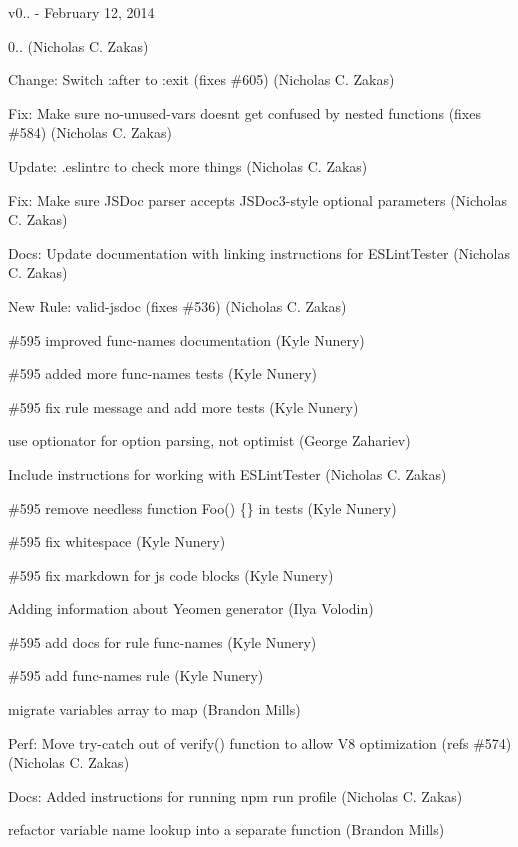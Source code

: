 v0.. -\/ February 12, 2014


\begin{DoxyItemize}
\item 0.. (Nicholas C. Zakas)
\item Change\+: Switch \+:after to \+:exit (fixes \#605) (Nicholas C. Zakas)
\item Fix\+: Make sure no-\/unused-\/vars doesn\textquotesingle{}t get confused by nested functions (fixes \#584) (Nicholas C. Zakas)
\item Update\+: .eslintrc to check more things (Nicholas C. Zakas)
\item Fix\+: Make sure J\+S\+Doc parser accepts J\+S\+Doc3-\/style optional parameters (Nicholas C. Zakas)
\item Docs\+: Update documentation with linking instructions for E\+S\+Lint\+Tester (Nicholas C. Zakas)
\item New Rule\+: valid-\/jsdoc (fixes \#536) (Nicholas C. Zakas)
\item \#595 improved func-\/names documentation (Kyle Nunery)
\item \#595 added more func-\/names tests (Kyle Nunery)
\item \#595 fix rule message and add more tests (Kyle Nunery)
\item use optionator for option parsing, not optimist (George Zahariev)
\item Include instructions for working with E\+S\+Lint\+Tester (Nicholas C. Zakas)
\item \#595 remove needless \textquotesingle{}function Foo() \{\}\textquotesingle{} in tests (Kyle Nunery)
\item \#595 fix whitespace (Kyle Nunery)
\item \#595 fix markdown for js code blocks (Kyle Nunery)
\item Adding information about Yeomen generator (Ilya Volodin)
\item \#595 add docs for rule func-\/names (Kyle Nunery)
\item \#595 add func-\/names rule (Kyle Nunery)
\item migrate variables array to map (Brandon Mills)
\item Perf\+: Move try-\/catch out of verify() function to allow V8 optimization (refs \#574) (Nicholas C. Zakas)
\item Docs\+: Added instructions for running npm run profile (Nicholas C. Zakas)
\item refactor variable name lookup into a separate function (Brandon Mills)

\end{DoxyItemize}
